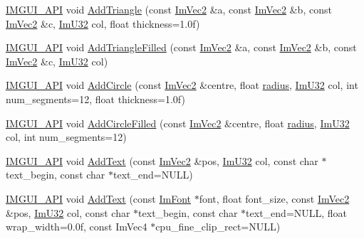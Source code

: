 \begin{DoxyCompactItemize}
\item 
\mbox{\hyperlink{imgui_8h_a43829975e84e45d1149597467a14bbf5}{I\+M\+G\+U\+I\+\_\+\+A\+PI}} void \mbox{\hyperlink{struct_im_draw_list_ad04c8e04644b1cf54c7c7b8f352d5e41}{Add\+Triangle}} (const \mbox{\hyperlink{struct_im_vec2}{Im\+Vec2}} \&a, const \mbox{\hyperlink{struct_im_vec2}{Im\+Vec2}} \&b, const \mbox{\hyperlink{struct_im_vec2}{Im\+Vec2}} \&c, \mbox{\hyperlink{imgui_8h_a118cff4eeb8d00e7d07ce3d6460eed36}{Im\+U32}} col, float thickness=1.\+0f)
\item 
\mbox{\hyperlink{imgui_8h_a43829975e84e45d1149597467a14bbf5}{I\+M\+G\+U\+I\+\_\+\+A\+PI}} void \mbox{\hyperlink{struct_im_draw_list_a2395370cf2dab19fce3c0e2542cd4f25}{Add\+Triangle\+Filled}} (const \mbox{\hyperlink{struct_im_vec2}{Im\+Vec2}} \&a, const \mbox{\hyperlink{struct_im_vec2}{Im\+Vec2}} \&b, const \mbox{\hyperlink{struct_im_vec2}{Im\+Vec2}} \&c, \mbox{\hyperlink{imgui_8h_a118cff4eeb8d00e7d07ce3d6460eed36}{Im\+U32}} col)
\item 
\mbox{\hyperlink{imgui_8h_a43829975e84e45d1149597467a14bbf5}{I\+M\+G\+U\+I\+\_\+\+A\+PI}} void \mbox{\hyperlink{struct_im_draw_list_a26c34a87eca6aefa02ca4e4951dcd170}{Add\+Circle}} (const \mbox{\hyperlink{struct_im_vec2}{Im\+Vec2}} \&centre, float \mbox{\hyperlink{graphics_8cpp_a5050a760c11da521cd4aee6336f6529f}{radius}}, \mbox{\hyperlink{imgui_8h_a118cff4eeb8d00e7d07ce3d6460eed36}{Im\+U32}} col, int num\+\_\+segments=12, float thickness=1.\+0f)
\item 
\mbox{\hyperlink{imgui_8h_a43829975e84e45d1149597467a14bbf5}{I\+M\+G\+U\+I\+\_\+\+A\+PI}} void \mbox{\hyperlink{struct_im_draw_list_a293e87d22e17587e3994cf6deb20be45}{Add\+Circle\+Filled}} (const \mbox{\hyperlink{struct_im_vec2}{Im\+Vec2}} \&centre, float \mbox{\hyperlink{graphics_8cpp_a5050a760c11da521cd4aee6336f6529f}{radius}}, \mbox{\hyperlink{imgui_8h_a118cff4eeb8d00e7d07ce3d6460eed36}{Im\+U32}} col, int num\+\_\+segments=12)
\item 
\mbox{\hyperlink{imgui_8h_a43829975e84e45d1149597467a14bbf5}{I\+M\+G\+U\+I\+\_\+\+A\+PI}} void \mbox{\hyperlink{struct_im_draw_list_ac5221bd86b3429f6d5b6e6ffe454942d}{Add\+Text}} (const \mbox{\hyperlink{struct_im_vec2}{Im\+Vec2}} \&pos, \mbox{\hyperlink{imgui_8h_a118cff4eeb8d00e7d07ce3d6460eed36}{Im\+U32}} col, const char $\ast$text\+\_\+begin, const char $\ast$text\+\_\+end=N\+U\+LL)
\item 
\mbox{\hyperlink{imgui_8h_a43829975e84e45d1149597467a14bbf5}{I\+M\+G\+U\+I\+\_\+\+A\+PI}} void \mbox{\hyperlink{struct_im_draw_list_a0a226cbe9bb1480428e145d8535cda26}{Add\+Text}} (const \mbox{\hyperlink{struct_im_font}{Im\+Font}} $\ast$font, float font\+\_\+size, const \mbox{\hyperlink{struct_im_vec2}{Im\+Vec2}} \&pos, \mbox{\hyperlink{imgui_8h_a118cff4eeb8d00e7d07ce3d6460eed36}{Im\+U32}} col, const char $\ast$text\+\_\+begin, const char $\ast$text\+\_\+end=N\+U\+LL, float wrap\+\_\+width=0.\+0f, const Im\+Vec4 $\ast$cpu\+\_\+fine\+\_\+clip\+\_\+rect=\+N\+U\+L\+L)

\end{DoxyCompactItemize}
